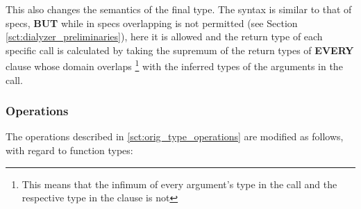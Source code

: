 This also changes the semantics of the final type. The syntax is
similar to that of specs, \textbf{BUT} while in specs overlapping is
not permitted (see Section \ref{sct:dialyzer_preliminaries}), here it
is allowed and the return type of each specific call is calculated by
taking the supremum of the return types of \textbf{EVERY} clause whose
domain overlaps \footnote{This means that the infimum of every
  argument's type in the call and the respective type in the clause is
  not \none} with the inferred types of the arguments in the call.

\subsubsection{Operations}

The operations described in \ref{sct:orig_type_operations} are
modified as follows, with regard to function types:

